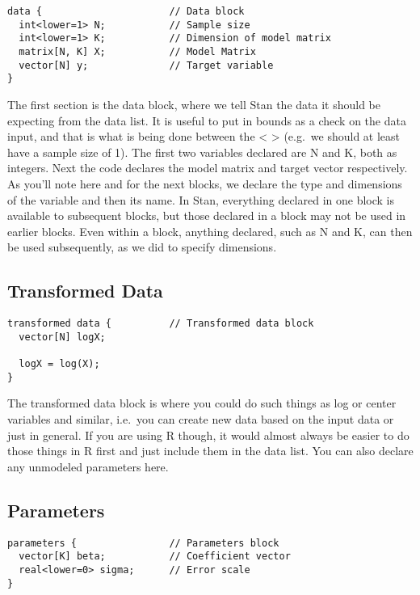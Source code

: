 \documentclass[]{book}
\begin{document}
\begin{verbatim}
data {                      // Data block
  int<lower=1> N;           // Sample size
  int<lower=1> K;           // Dimension of model matrix
  matrix[N, K] X;           // Model Matrix
  vector[N] y;              // Target variable
}
\end{verbatim}

The first section is the {data} block, where we tell Stan the data it
should be expecting from the data list. It is useful to put in bounds as
a check on the data input, and that is what is being done between the
\textless{} \textgreater{} (e.g.~we should at least have a sample size
of 1). The first two variables declared are N and K, both as integers.
Next the code declares the model matrix and target vector respectively.
As you'll note here and for the next blocks, we declare the type and
dimensions of the variable and then its name. In Stan, everything
declared in one block is available to subsequent blocks, but those
declared in a block may not be used in earlier blocks. Even within a
block, anything declared, such as N and K, can then be used
subsequently, as we did to specify dimensions.

\subsection{Transformed Data}\label{transformed-data}

\begin{verbatim}
transformed data {          // Transformed data block
  vector[N] logX;
  
  logX = log(X);
} 
\end{verbatim}

The {transformed data} block is where you could do such things as log or
center variables and similar, i.e.~you can create new data based on the
input data or just in general. If you are using R though, it would
almost always be easier to do those things in R first and just include
them in the data list. You can also declare any unmodeled parameters
here.

\subsection{Parameters}\label{parameters}

\begin{verbatim}
parameters {                // Parameters block
  vector[K] beta;           // Coefficient vector
  real<lower=0> sigma;      // Error scale
}
\end{verbatim}
\end{document}
